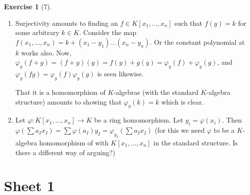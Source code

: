 \documentclass[reqno]{amsart}
\theoremstyle{definition}
\newtheorem{exercise}[theorem]{Exercise}
\theoremstyle{remark}
\begin{document}
\begin{exercise}[7]
    \begin{enumerate}
        \item Surjectivity amounts to finding an
            $f \in K \left[ x_1, \ldots, x_n \right] $ 
            such that $f(y) = k$ for some arbitrary $k \in K$.
            Consider the map
            $f(x_1,\ldots,x_n) =
            k + \left( x_1-y_1 \right) \ldots \left( x_n
            -y_n\right) $. Or the constant polynomial at $k$ works
            also. Now,
            $\varphi_y \left( f+g \right) 
            = \left( f+g \right) (y)
            = f(y) + g(y) = \varphi_y(f) + 
            \varphi_y(g)$, and
            $\varphi_y(fg) = \varphi_y(f)\varphi_y(g)$ is
            seen likewise. 

            That it is a homomorphism of
            $K$-algebras (with the
            standard $K$-algebra structure)
            amounts to showing that
            $\varphi_y\left( k  \right) 
            = k $ which is clear.
        \item Let $\varphi  \colon K \left[ x_1, \ldots, x_n
            \right]  \to K$ be a ring homomorphism. 
            Let $y_i = \varphi (x_i)$. Then
            $\varphi \left( \sum a_I x_I \right) 
            = \sum \varphi \left( a_I \right) 
             y_I = 
             \varphi_{y_I}\left( \sum a_I x_I \right) $
             (for this we need
             $\varphi $ to be a $K$-algebra
             homomorphism of with
              $K\left[ x_1, \ldots,x_n \right] $ 
              in the standard structure.
              Is there a different way of arguing?)
    \end{enumerate}
\end{exercise}

\section{Sheet 1}
\end{document}
